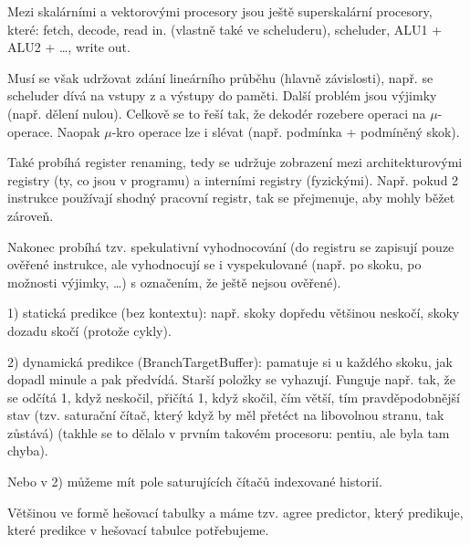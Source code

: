 \documentclass[12pt]{article}                   %
\begin{document}
        \begin{definice}
            Mezi skalárními a vektorovými procesory jsou ještě superskalární procesory, které: fetch, decode, read in. (vlastně také ve scheluderu), scheluder, ALU1 + ALU2 + …, write out.

            Musí se však udržovat zdání lineárního průběhu (hlavně závislosti), např. se scheluder dívá na vstupy z a výstupy do paměti. Další problém jsou výjimky (např. dělení nulou). Celkově se to řeší tak, že dekodér rozebere operaci na $\mu$-operace. Naopak $\mu$-kro operace lze i slévat (např. podmínka + podmíněný skok).

            Také probíhá register renaming, tedy se udržuje zobrazení mezi architekturovými registry (ty, co jsou v programu) a interními registry (fyzickými). Např. pokud 2 instrukce používají shodný pracovní registr, tak se přejmenuje, aby mohly běžet zároveň.

            Nakonec probíhá tzv. spekulativní vyhodnocování (do registru se zapisují pouze ověřené instrukce, ale vyhodnocují se i vyspekulované (např. po skoku, po možnosti výjimky, …) s označením, že ještě nejsou ověřené).
        \end{definice}

        \begin{definice}
            1) statická predikce (bez kontextu): např. skoky dopředu většinou neskočí, skoky dozadu skočí (protože cykly).

            2) dynamická predikce (BranchTargetBuffer): pamatuje si u každého skoku, jak dopadl minule a pak předvídá. Starší položky se vyhazují. Funguje např. tak, že se odčítá 1, když neskočil, přičítá 1, když skočil, čím větší, tím pravděpodobnější stav (tzv. saturační čítač, který když by měl přetéct na libovolnou stranu, tak zůstává) (takhle se to dělalo v prvním takovém procesoru: pentiu, ale byla tam chyba).

            Nebo v 2) můžeme mít pole saturujících čítačů indexované historií.
        \end{definice}


        \begin{definice}
            Většinou ve formě hešovací tabulky a máme tzv. agree predictor, který predikuje, které predikce v hešovací tabulce potřebujeme.
        \end{definice}
\end{document}

